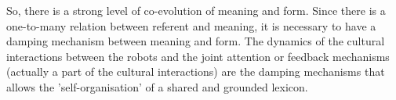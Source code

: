 So, there is a strong level of co-evolution of meaning and form. Since there is a one-to-many relation between referent and meaning, it is necessary to have a damping mechanism between meaning and form. The dynamics of the cultural interactions between the robots and the joint attention or feedback mechanisms (actually a part of the cultural interactions) are the damping mechanisms that allows the 'self-organisation' of a shared and grounded lexicon.


